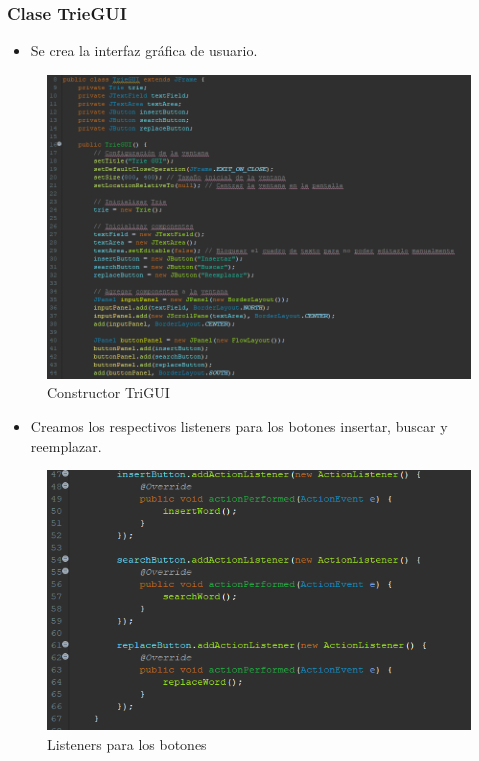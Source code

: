 \documentclass{article}
\begin{document}
          \subsubsection{Clase TrieGUI}
          \begin{itemize}
              \item Se crea la interfaz gráfica de usuario.
          \end{itemize}
          \begin{figure}[H]
              \centering
              \includegraphics[scale=0.79]{img/img1.png}
              \caption{Constructor TriGUI}
              \label{fig:enter-label}
          \end{figure}
          \clearpage
          \begin{itemize}
              \item Creamos los respectivos listeners para los botones insertar, buscar y reemplazar.
          \end{itemize}
          \begin{figure}[H]
              \centering
              \includegraphics{img/img2.png}
              \caption{Listeners para los botones}
              \label{fig:enter-label}
          \end{figure}
\end{document}
